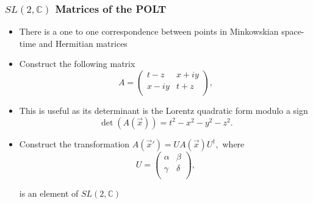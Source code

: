 \documentclass[10pt,a4paper]{beamer}
\begin{document}
\begin{frame}
\frametitle{$SL(2,\mathbb{C})$ Matrices of the POLT}
\begin{itemize}
\item<1->{There is a one to one correspondence between points in Minkowskian space-time and Hermitian matrices} 
\item<2->{Construct the following matrix 
\begin{equation*}
A = 
\left( 
\begin{array}{cc}
t-z    & x + i y \\
x - iy & t+z \\
\end{array} 
\right),
\end{equation*}}
\item<3->{This is useful as its determinant is the Lorentz quadratic form modulo a sign $$\det(A(\vec{x})) = t^2 - x^2 - y^2 - z^2.$$}
\item<4->{Construct the transformation $A(\vec{x}') = U A(\vec{x}) U^{\dagger},$ where 
\begin{equation*} 
U = \left( 
\begin{array}{cc}
\alpha & \beta \\
\gamma & \delta \\
\end{array}
\right),
\end{equation*}

\noindent is an element of $SL(2,\mathbb{C})$}
\end{itemize}

\end{frame}
\end{document}
